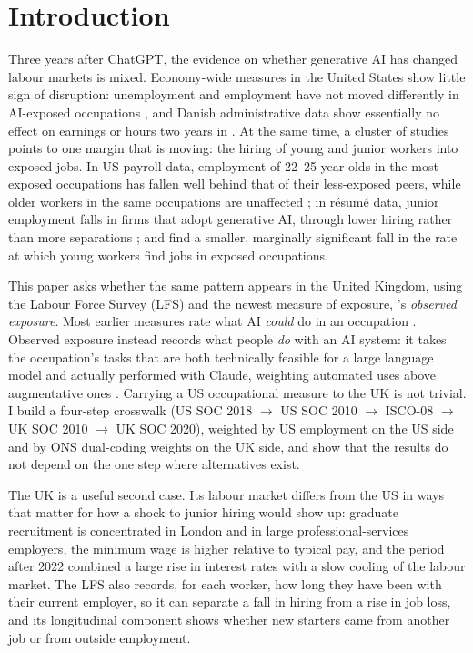 \documentclass[11pt]{article}
\begin{document}
\newpage
\section{Introduction}\label{sec:intro}

Three years after ChatGPT, the evidence on whether generative AI has changed labour markets is mixed. Economy-wide measures in the United States show little sign of disruption: unemployment and employment have not moved differently in AI-exposed occupations \citep{gimbel2025,massenkoff2026}, and Danish administrative data show essentially no effect on earnings or hours two years in \citep{humlum2025nber}. At the same time, a cluster of studies points to one margin that is moving: the hiring of young and junior workers into exposed jobs. In US payroll data, employment of 22--25 year olds in the most exposed occupations has fallen well behind that of their less-exposed peers, while older workers in the same occupations are unaffected \citep{brynjolfsson2025canaries}; in r\'esum\'e data, junior employment falls in firms that adopt generative AI, through lower hiring rather than more separations \citep{hosseini2025}; and \citet{massenkoff2026} find a smaller, marginally significant fall in the rate at which young workers find jobs in exposed occupations.

This paper asks whether the same pattern appears in the United Kingdom, using the Labour Force Survey (LFS) and the newest measure of exposure, \citet{massenkoff2026}'s \emph{observed exposure}. Most earlier measures rate what AI \emph{could} do in an occupation \citep{felten2021,webb2020,eloundou2024}. Observed exposure instead records what people \emph{do} with an AI system: it takes the occupation's tasks that are both technically feasible for a large language model and actually performed with Claude, weighting automated uses above augmentative ones \citep{handa2025}. Carrying a US occupational measure to the UK is not trivial. I build a four-step crosswalk (US SOC 2018 $\to$ US SOC 2010 $\to$ ISCO-08 $\to$ UK SOC 2010 $\to$ UK SOC 2020), weighted by US employment on the US side and by ONS dual-coding weights on the UK side, and show that the results do not depend on the one step where alternatives exist.

The UK is a useful second case. Its labour market differs from the US in ways that matter for how a shock to junior hiring would show up: graduate recruitment is concentrated in London and in large professional-services employers, the minimum wage is higher relative to typical pay, and the period after 2022 combined a large rise in interest rates with a slow cooling of the labour market. The LFS also records, for each worker, how long they have been with their current employer, so it can separate a fall in hiring from a rise in job loss, and its longitudinal component shows whether new starters came from another job or from outside employment.
\end{document}
